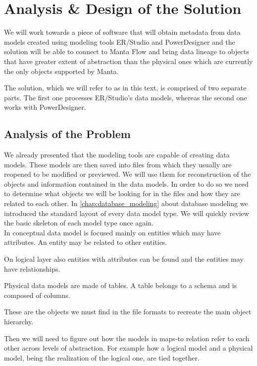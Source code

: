 \chapter{Analysis \& Design of the Solution}

We will work towards a piece of software that will obtain metadata from data models created using modeling tools ER/Studio and PowerDesigner and the solution will be able to connect to Manta Flow and bring data lineage to objects that have greater extent of abstraction than the physical ones which are currently the only objects supported by Manta.

The solution, which we will refer to as  in this text, is comprised of two separate parts. The first one processes ER/Studio's data models, whereas the second one works with PowerDesigner.

\section{Analysis of the Problem}

We already presented that the modeling tools are capable of creating data models. These models are then saved into files from which they usually are reopened to be modified or previewed. We will use them for reconstruction of the objects and information contained in the data models.
In order to do so we need to determine what objects we will be looking for in the files and how they are related to each other.
In \autoref{chap:database_modeling} about database modeling we introduced the standard layout of every data model type. We will quickly review the basic skeleton of each model type once again. \\

In conceptual data model is focused mainly on entities which may have attributes. An entity may be related to other entities.

On logical layer also entities with attributes can be found and the entities may have relationships.

Physical data models are made of tables. A table belongs to a schema and is composed of columns.

These are the objects we must find in the file formats to recreate the main object hierarchy.

Then we will need to figure out how the models in maps-to relation refer to each other across levels of abstraction. For example how a logical model and a physical model, being the realization of the logical one, are tied together.

